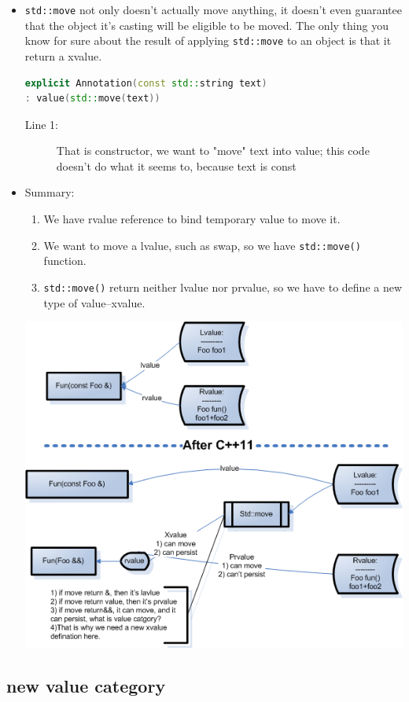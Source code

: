 \documentclass[a4paper,11pt,twoside]{book}
\begin{document}
\begin{itemize}
    \item  \texttt{std::move} not only doesn't actually move anything, it doesn't even guarantee that the object it's casting will be eligible to be moved. The only thing you know for sure about the result of applying \texttt{std::move} to an object is that it return a xvalue.

\begin{lstlisting}[frame=single, language=c++]
explicit Annotation(const std::string text)
: value(std::move(text)) 
\end{lstlisting}
\begin{description}
	\item[Line 1:] That is constructor, we want to "move" text into value; this code doesn't do what it seems to, because text is const
\end{description}
	
	\item Summary:
	\begin{enumerate}
		\item We have rvalue reference to bind temporary value to move it.
		\item We want to move a lvalue, such as swap, so we have \texttt{std::move()} function.
		\item \texttt{std::move()} return neither lvalue nor prvalue, so we have to define a new type of value--xvalue.
	\end{enumerate}
	
\begin{center}	
		\includegraphics[width=0.7\linewidth]{pics/xvalue.png}
		\label{fig:xvalue}
    \end{center}
\end{itemize}


\subsection{new value category}
\end{document}
